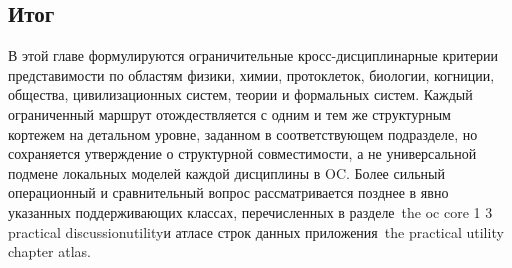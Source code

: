 \subsection*{Итог}

В этой главе формулируются ограничительные кросс-дисциплинарные критерии
представимости по областям физики, химии, протоклеток, биологии,
когниции, общества, цивилизационных систем, теории и формальных систем.
Каждый ограниченный маршрут отождествляется с одним и тем же структурным
кортежем на детальном уровне, заданном в соответствующем подразделе, но
сохраняется утверждение о структурной совместимости, а не универсальной
подмене локальных моделей каждой дисциплины в OC. Более сильный
операционный и сравнительный вопрос рассматривается позднее в явно указанных
поддерживающих классах, перечисленных
в разделе~the oc core 1 3 practical discussionutilityи атласе строк данных
приложения~the practical utility chapter atlas.

